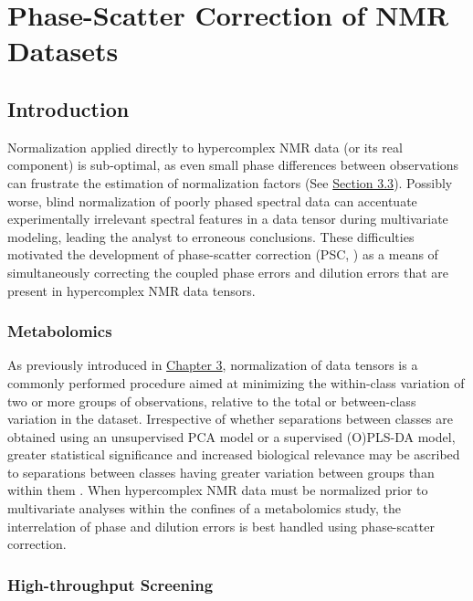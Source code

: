 
\chapter{Phase-Scatter Correction of NMR Datasets}

\section{Introduction}

\begin{doublespace}
Normalization applied directly to hypercomplex NMR data (or its real component)
is sub-optimal, as even small phase differences between observations can
frustrate the estimation of normalization factors
(See \hyperlink{section.3.3}{Section 3.3}). Possibly worse, blind
normalization of poorly phased spectral data can accentuate experimentally
irrelevant spectral features in a data tensor during multivariate modeling,
leading the analyst to erroneous conclusions. These difficulties motivated
the development of phase-scatter correction (PSC, \cite{worley:cils2014}) as
a means of simultaneously correcting the coupled phase errors and dilution
errors that are present in hypercomplex NMR data tensors.
\end{doublespace}

\subsection{Metabolomics}

\begin{doublespace}
As previously introduced in \hyperlink{chapter.3}{Chapter 3}, normalization
of data tensors is a commonly performed procedure aimed at minimizing the
within-class variation of two or more groups of observations, relative to
the total or between-class variation in the dataset. Irrespective of whether
separations between classes are obtained using an unsupervised PCA model or a
supervised (O)PLS-DA model, greater statistical significance and increased
biological relevance may be ascribed to separations between classes having
greater variation between groups than within them \cite{worley:abio2013}.
When hypercomplex NMR data must be normalized prior to multivariate analyses
within the confines of a metabolomics study, the interrelation of phase and
dilution errors is best handled using phase-scatter correction.
\end{doublespace}

\subsection{High-throughput Screening}

